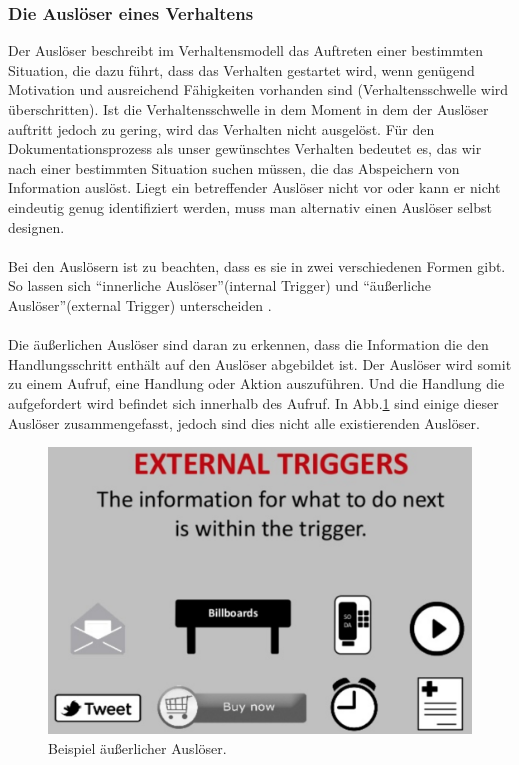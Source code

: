 \documentclass[a4paper,12pt]{scrartcl}
\begin{document}
\subsubsection{Die Auslöser eines Verhaltens}
Der Auslöser beschreibt im Verhaltensmodell das Auftreten einer bestimmten Situation, die dazu führt, dass das Verhalten gestartet wird, wenn genügend Motivation und ausreichend Fähigkeiten vorhanden sind (Verhaltensschwelle wird überschritten). Ist die Verhaltensschwelle in dem Moment in dem der Auslöser auftritt jedoch zu gering, wird das Verhalten nicht ausgelöst. Für den Dokumentationsprozess als unser gewünschtes Verhalten bedeutet es, das wir nach einer bestimmten Situation suchen müssen, die das Abspeichern von Information auslöst. Liegt ein betreffender Auslöser nicht vor oder kann er nicht eindeutig genug identifiziert werden, muss man alternativ einen Auslöser selbst designen.
\\\\
Bei den Auslösern ist zu beachten, dass es sie in zwei verschiedenen Formen gibt. So lassen sich \enquote{innerliche Auslöser}(internal Trigger) und \enquote{äußerliche Auslöser}(external Trigger) unterscheiden \cite{Eyal2014}.
\\\\
Die äußerlichen Auslöser sind daran zu erkennen, dass die Information die den Handlungsschritt enthält auf den Auslöser abgebildet ist. Der Auslöser wird somit zu einem Aufruf, eine Handlung oder Aktion auszuführen. Und die Handlung die aufgefordert wird befindet sich innerhalb des Aufruf. In Abb.\ref{externaltriggerBild} sind einige dieser Auslöser zusammengefasst, jedoch sind dies nicht alle existierenden Auslöser.
\begin{figure}[h!]
\begin{center}
\includegraphics[scale = 0.4]{Bilder/externalTrigger.eps}
\caption{Beispiel äußerlicher Auslöser\cite{ExternalTrigger2018}.}
\label{externaltriggerBild}
\end{center}
\end{figure}
\end{document}
